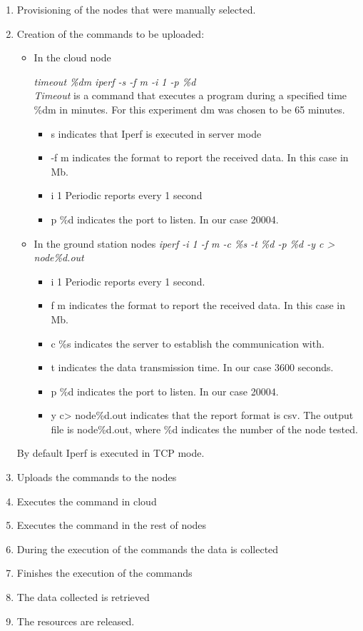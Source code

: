 \begin{enumerate}
\item Provisioning of the nodes that were manually selected.
\item Creation of the commands to be uploaded:
\begin{itemize}
\item In the cloud node

\emph{timeout \%dm iperf -s -f m -i 1 -p \%d} \\
\emph{Timeout} is a command that executes a program during a specified time \%dm in
minutes. For this experiment dm was chosen to be 65 minutes.
\begin{itemize}
\item s indicates that Iperf is executed in server mode
\item -f m indicates the format to report the received data. In this case in Mb.
\item i 1 Periodic reports every 1 second
\item p \%d indicates the port to listen. In our case 20004.
\end{itemize}

\item In the ground station nodes
\emph{iperf  -i 1 -f m -c \%s -t \%d -p \%d  -y c > node\%d.out}\\
\begin{itemize}
\item i 1 Periodic reports every 1 second.
\item f m indicates the format to report the received data. In this case in Mb.
\item c \%s indicates the server to establish the communication with.
\item t indicates the data transmission time. In our case 3600 seconds.
\item p \%d indicates the port to listen. In our case 20004.
\item y c> node\%d.out indicates that the report format is csv. The output file
  is node\%d.out, where \%d indicates the number of the node tested.
\end{itemize}
\end{itemize}

By default Iperf is executed in TCP mode.

\item Uploads the commands to the nodes
\item Executes the command in cloud
\item Executes the command in the rest of nodes
\item During the execution of the commands the data is collected
\item Finishes the execution of the commands
\item The data collected is retrieved
\item The resources are released.
\end{enumerate}

